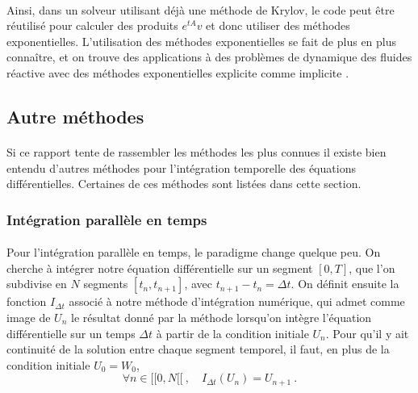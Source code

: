     \paragraph{}
    Ainsi, dans un solveur utilisant déjà une méthode de Krylov, le code peut être réutilisé pour calculer des produits $e^{tA}v$ et donc utiliser des méthodes exponentielles.
    L'utilisation des méthodes exponentielles se fait de plus en plus connaître, et on trouve des applications à des problèmes de dynamique des fluides réactive avec des méthodes exponentielles explicite \cite{BhattKhaliqWade2018} comme implicite \cite{NieZhangZhao2006}.



  \subsection{Autre méthodes}

    \paragraph{}
    Si ce rapport tente de rassembler les méthodes les plus connues il existe bien entendu d'autres méthodes pour l'intégration temporelle des équations différentielles.
    Certaines de ces méthodes sont listées dans cette section.

    \subsubsection{Intégration parallèle en temps}

      \paragraph{}
      Pour l'intégration parallèle en temps, le paradigme change quelque peu.
      On cherche à intégrer notre équation différentielle sur un segment $\left[0, T\right]$, que l'on subdivise en $N$ segments $\left[t_n, t_{n+1}\right]$, avec $t_{n+1} - t_n = \Delta t$.
      On définit ensuite la fonction $I_{\Delta t}$ associé à notre méthode d'intégration numérique, qui admet comme image de $U_n$ le résultat donné par la méthode lorsqu'on intègre l'équation différentielle sur un temps $\Delta t$ à partir de la condition initiale $U_n$.
      Pour qu'il y ait continuité de la solution entre chaque segment temporel, il faut, en plus de la condition initiale $U_0 = W_0$,
      \[\forall n\in  [\![0, N[\![\ ,\quad I_{\Delta t}\left(U_n\right) = U_{n+1}\ .\]

